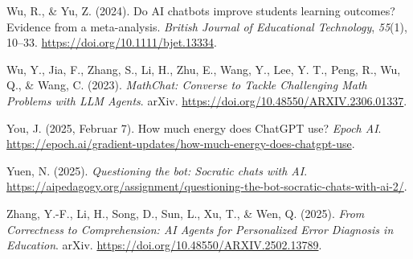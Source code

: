 \documentclass[
  ngerman,
  letterpaper,
  DIV=11]{scrreprt}
\newlength{\cslhangindent}
\newenvironment{CSLReferences}[2] %
 {\begin{list}{}{%
  \setlength{\itemindent}{0pt}
  \setlength{\leftmargin}{0pt}
  \setlength{\parsep}{0pt}
  \ifodd #1
   \setlength{\leftmargin}{\cslhangindent}
   \setlength{\itemindent}{-1\cslhangindent}
  \fi
  \setlength{\itemsep}{#2\baselineskip}}}
 {\end{list}}
\begin{document}
\begin{CSLReferences}{1}{0}
Wu, R., \& Yu, Z. (2024). Do AI chatbots improve students learning
outcomes? Evidence from a meta-analysis. \emph{British Journal of
Educational Technology}, \emph{55}(1), 10--33.
\url{https://doi.org/10.1111/bjet.13334}.

Wu, Y., Jia, F., Zhang, S., Li, H., Zhu, E., Wang, Y., Lee, Y. T., Peng,
R., Wu, Q., \& Wang, C. (2023). \emph{MathChat: Converse to Tackle
Challenging Math Problems with LLM Agents}. arXiv.
\url{https://doi.org/10.48550/ARXIV.2306.01337}.

You, J. (2025, Februar 7). How much energy does ChatGPT use? \emph{Epoch
AI}.
\url{https://epoch.ai/gradient-updates/how-much-energy-does-chatgpt-use}.

Yuen, N. (2025). \emph{Questioning the bot: Socratic chats with AI}.
\url{https://aipedagogy.org/assignment/questioning-the-bot-socratic-chats-with-ai-2/}.

Zhang, Y.-F., Li, H., Song, D., Sun, L., Xu, T., \& Wen, Q. (2025).
\emph{From Correctness to Comprehension: AI Agents for Personalized
Error Diagnosis in Education}. arXiv.
\url{https://doi.org/10.48550/ARXIV.2502.13789}.

\end{CSLReferences}
\end{document}

